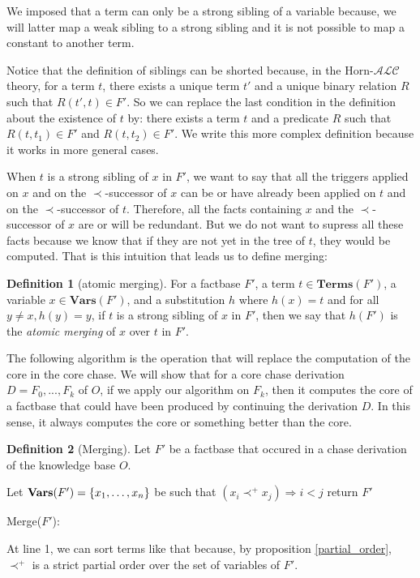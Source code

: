 \documentclass{article}
\theoremstyle{definition}
\newtheorem{definition}{Definition}[section]
\theoremstyle{remark}
\newcommand{\Vars}{\textbf{Vars}}
\newcommand{\Terms}{\textbf{Terms}}
\begin{document}
We imposed that a term can only be a strong sibling of a variable because, we will latter map a weak sibling to a strong sibling and it is not possible to map a constant to another term.

Notice that the definition of siblings can be shorted because, in the Horn-$\mathcal{ALC}$ theory, for a term $t$, there exists a unique term $t'$ and a unique binary relation $R$ such that $R(t',t)\in F'$. So we can replace the last condition in the definition about the existence of $t$ by: there exists a term $t$ and a predicate $R$ such that $R(t,t_1) \in F'$ and $R(t,t_2) \in F'$. We write this more complex definition because it works in more general cases.

When $t$ is a strong sibling of $x$ in $F'$, we want to say that all the triggers applied on $x$ and on the $\prec$-successor of $x$ can be or have already been applied on $t$ and on the $\prec$-successor of $t$. Therefore, all the facts containing $x$ and the $\prec$-successor of $x$ are or will be redundant. But we do not want to supress all these facts because we know that if they are not yet in the tree of $t$, they would be computed. That is this intuition that leads us to define merging:

\begin{definition}[atomic merging]
For a factbase $F'$, a term $t \in \Terms(F')$, a variable $x\in \Vars(F')$, and a substitution $h$ where $h(x) =t$ and for all $y \neq x, h(y)=y$, if $t$ is a strong sibling of $x$ in $F'$, then we say that $h(F')$ is the \emph{atomic merging} of $x$ over $t$ in $F'$.
\end{definition}

The following algorithm is the operation that will replace the computation of the core in the core chase. We will show that for a core chase derivation $D =F_0,...,F_k$ of $O$, if we apply our algorithm on $F_k$, then it computes the core of a factbase that could have been produced by continuing the derivation $D$. In this sense, it always computes the core or something better than the core.

\begin{definition}[Merging]
Let $F'$ be a factbase that occured in a chase derivation of the knowledge base $O$.

\begin{algorithm}[H]
\SetAlgoLined


    Let $\textbf{\Vars}(F') = \{x_1,\ldots, x_n\}$ be such that $(x_i \prec^+ x_j) \Rightarrow i < j$ \;
return $F'$
\caption{Merge($F'$):}


\end{algorithm}
At line 1, we can sort terms like that because, by proposition \ref{partial_order}, $\prec^+$ is a strict partial order over the set of variables of $F'$.
\end{definition}
\end{document}

